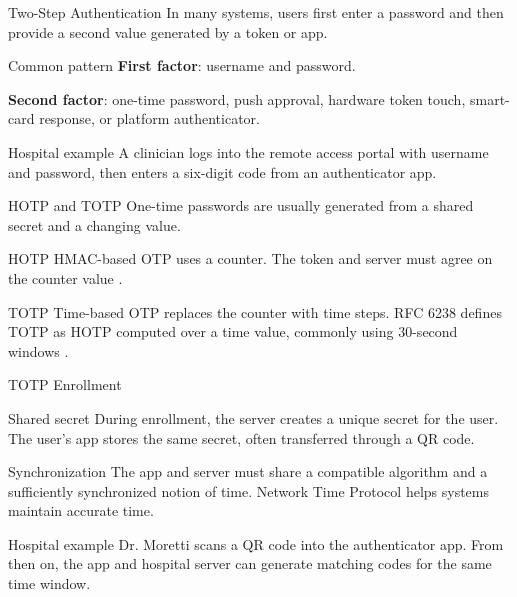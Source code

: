 \documentclass[presentation]{beamer}
\begin{document}
\begin{frame}[c]{Two-Step Authentication}
  In many systems, users first enter a password and then provide a second value generated by a token or app.

  \begin{block}{Common pattern}
    \textbf{First factor}: username and password.

    \textbf{Second factor}: one-time password, push approval, hardware token touch, smart-card response, or platform authenticator.
  \end{block}

  \begin{exampleblock}{Hospital example}
    A clinician logs into the remote access portal with username and password, then enters a six-digit code from an authenticator app.
  \end{exampleblock}
\end{frame}

\begin{frame}[c]{HOTP and TOTP}
  One-time passwords are usually generated from a shared secret and a changing value.

  \begin{block}{HOTP}
    HMAC-based OTP uses a counter. The token and server must agree on the counter value \cite{rfc4226}.
  \end{block}

  \begin{block}{TOTP}
    Time-based OTP replaces the counter with time steps. RFC 6238 defines TOTP as HOTP computed over a time value, commonly using 30-second windows \cite{rfc6238}.
  \end{block}
\end{frame}

\begin{frame}[c]{TOTP Enrollment}
  \begin{block}{Shared secret}
    During enrollment, the server creates a unique secret for the user. The user's app stores the same secret, often transferred through a QR code.
  \end{block}

  \begin{block}{Synchronization}
    The app and server must share a compatible algorithm and a sufficiently synchronized notion of time. Network Time Protocol helps systems maintain accurate time.
  \end{block}

  \begin{exampleblock}{Hospital example}
    Dr. Moretti scans a QR code into the authenticator app. From then on, the app and hospital server can generate matching codes for the same time window.
  \end{exampleblock}
\end{frame}
\end{document}
